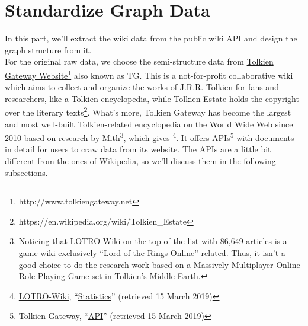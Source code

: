 \chapter{Standardize Graph Data}
\label{Ch-2:Sec:Standardize}

In this part, we'll extract the wiki data from the public wiki API and design the graph structure from it.\\
For the original raw data, we choose the semi-structure data from \href{http://www.tolkiengateway.net}{Tolkien Gateway Website}\footnote{http://www.tolkiengateway.net} also known as TG. This is a not-for-profit collaborative wiki which aims to collect and organize the works of J.R.R. Tolkien for fans and researchers, like a Tolkien encyclopedia, while Tolkien Estate holds the copyright over the literary texts\footnote{https://en.wikipedia.org/wiki/Tolkien\_Estate}. What's more, Tolkien Gateway has become the largest and most well-built Tolkien-related encyclopedia on the World Wide Web since 2010 based on \href{http://tolkiengateway.net/wiki/List\_of\_Tolkien\_Encyclopedias}{research} by Mith\footnote{Noticing that \href{https://lotro-wiki.com/}{LOTRO-Wiki} on the top of the list with \href{https://lotro-wiki.com/index.php/Special:Statistics}{86,649 articles} is a game wiki exclusively ``\href{https://lotro-wiki.com/index.php/Lord_of_the_Rings_Online}{Lord of the Rings Online}''-related. Thus, it isn't a good choice to do the research work based on a Massively Multiplayer Online Role-Playing Game set in Tolkien's Middle-Earth.}, which gives \footnote{\href{https://lotro-wiki.com/index.php/Lord\_of\_the\_Rings\_Online}{LOTRO-Wiki}, ``\href{https://lotro-wiki.com/index.php/Special:Statistics}{Statistics}'' (retrieved 15 March 2019)}. It offers \href{http://tolkiengateway.net/w/api.php}{APIs}\footnote{Tolkien Gateway, ``\href{http://tolkiengateway.net/w/api.php}{API}'' (retrieved 15 March 2019)} with documents in detail for users to craw data from its website. The APIs are a little bit different from the ones of Wikipedia, so we'll discuss them in the following subsections.

